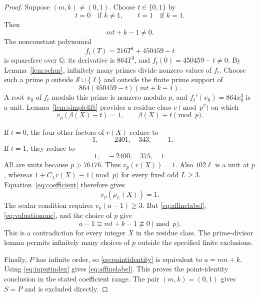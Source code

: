 \documentclass[11pt,a4paper]{article}
\newcommand{\Q}{\mathbb Q}
\begin{document}
\begin{proof}
Suppose $(m,k)\ne(0,1)$. Choose $t\in\{0,1\}$ by
\[
 t=0\quad\text{if }k\ne1,\qquad
 t=1\quad\text{if }k=1.
\]
Then
\begin{equation}\label{eq:nonzeroconstant}
                               mt+k-1\ne0.
\end{equation}
The nonconstant polynomial
\[
                    f_t(T)=216T^4+450459-t
\]
is squarefree over $\Q$: its derivative is $864T^3$, and
$f_t(0)=450459-t\ne0$. By Lemma~\ref{lem:schur}, infinitely many
primes divide nonzero values of $f_t$. Choose such a prime $p$
outside $\mathcal S\cup\{\ell\}$ and outside the finite prime
support of
\[
                        864(450459-t)(mt+k-1).
\]
A root $x_0$ of $f_t$ modulo this prime is nonzero modulo $p$,
and $f_t'(x_0)=864x_0^3$ is a unit. Lemma~\ref{lem:simplelift}
provides a residue class $c\pmod{p^2}$ on which
\begin{equation}\label{eq:valuationone}
                   v_p(\beta(X)-t)=1,\qquad
                   \beta(X)\equiv t\pmod p.
\end{equation}

If $t=0$, the four other factors of $r(X)$ reduce to
\[
                              -1,\quad-2401,\quad343,\quad-1.
\]
If $t=1$, they reduce to
\[
                              1,\quad-2400,\quad375,\quad1.
\]
All are units because $p>76176$. Thus
$v_p(r(X))=1$. Also $102\ell$ is a unit at $p$, whereas
$1+C_Lr(X)\equiv1\pmod p$ for every fixed odd $L\ge3$.
Equation~\eqref{eq:coefficient} therefore gives
\[
                               v_p(\rho_L(X))=1.
\]
The scalar condition requires $v_p(a-1)\ge3$. But
\eqref{eq:affinelabel}, \eqref{eq:valuationone}, and the choice
of $p$ give
\[
                    a-1\equiv mt+k-1\not\equiv0\pmod p.
\]
This is a contradiction for every integer $X$ in the residue class.
The prime-divisor lemma permits infinitely many choices of $p$ outside
the specified finite exclusions.

Finally, $P$ has infinite order, so
\eqref{eq:pointidentity} is equivalent to $a=mn+k$.
Using \eqref{eq:inputindex} gives \eqref{eq:affinelabel}.
This proves the point-identity conclusion in the stated coefficient
range. The pair $(m,k)=(0,1)$ gives $S=P$ and is excluded directly.
\end{proof}
\end{document}
